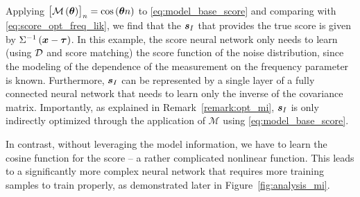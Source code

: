 {Applying $\left[{\mathcal{M}\left(\bm{\theta}\right)}\right]_n=\cos{\left(\bm{\theta}n\right)}$ to \eqref{eq:model_base_score} 
and comparing with \eqref{eq:score_opt_freq_lik}, we find that the  
 $\bm{s}_I$ %
 {that provides the true score}
is given by $\Sigma^{-1}\left(\bm{x}-\bm{\tau}\right)$. %
{In this example, the score neural network only 
needs to learn (using $\mathcal{D}$ and score matching) the score function of the noise distribution, 
since the modeling of the dependence of the measurement on the frequency parameter is known. }
{Furthermore, $\bm{s}_I$ } can be represented by a single layer of a fully connected neural network that needs to learn only the inverse of the covariance matrix. %
{%
Importantly, as explained in Remark~\ref{remark:opt_mi}, $\bm{s}_{I}$ is only indirectly {optimized} through the application of $\mathcal{M}$ using \eqref{eq:model_base_score}.%
}

In contrast, without leveraging the model information, we %
have to learn the cosine function for the score -- a rather complicated nonlinear function. This 
leads to a significantly more complex neural network that %
requires more training samples  to train properly, %
{as demonstrated later in Figure~\ref{fig:analysis_mi}}. 

}
